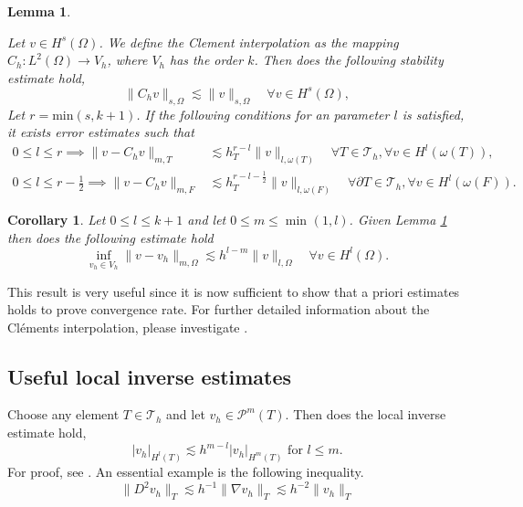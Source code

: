 \documentclass[11pt]{article}
\newtheorem{corollary}[theorem]{Corollary}
\newtheorem{lemma}[theorem]{Lemma}
\theoremstyle{remark}
\newcommand{\abs}[1]{\left\lvert #1 \right\rvert}
\renewcommand{\le}{\leqslant}
\numberwithin{equation}{section}
\begin{document}
\begin{lemma}
    \label{lemma:clements}

    Let $v \in H^{s}( \Omega ) $. We define the Clement interpolation as the mapping
$C_{h}: L^{2}( \Omega )   \to  V_{h}$, where $V_{h}$ has the order $k$. Then does the following stability estimate hold,
\[
 \| C_{h} v \|_{ s, \Omega     }^{  } \lesssim \| v \|_{ s, \Omega   }^{  } \quad \forall v \in H^{s}( \Omega ) ,
\]
Let $r = \mathrm{min} ( s, k+1) $. If the following conditions for an parameter $l$ is satisfied, it exists error estimates such that
\begin{equation}
    \begin{split}
      0\le l \le r  \implies \| v - C_{h} v \|_{ m,T   }^{  }  &  \lesssim h^{r-l}_{T} \| v \|_{l,\omega \left( T \right)  }^{  } \quad  \forall T \in \mathcal{T} _{h}, \forall v \in H^{l}( \omega \left( T \right)
      ), \\
      0\le l \le r-\frac{1}{2}  \implies \| v - C_{h} v \|_{ m,F }^{  } & \lesssim h^{r - l - \frac{1}{2}}_{T} \| v \|_{l,\omega \left( F \right)  }^{  } \quad  \forall \partial T \in \mathcal{T} _{h}, \forall v \in H^{l}( \omega \left( F
      \right)).
    \end{split}
\end{equation}

\end{lemma}


\begin{corollary}
    \label{cor:celement_apriori}
    Let $0 \le l \le k+1$ and let $0\le m \le \min_{} ( 1,l )$.
    Given Lemma \ref{lemma:clements}  then does the following estimate hold
    \[
    \inf_{v_{h} \in V_{h} } \| v - v_{h} \|_{  m,\Omega }^{  } \lesssim   h^{l-m}  \| v \|_{ l,\Omega  }^{  } \quad     \forall v \in H^{l}( \Omega ).
    \]
\end{corollary}
This result is very useful since it is now sufficient to show that a priori estimates holds to prove convergence rate. For further detailed information about the Cléments interpolation, please investigate \cite[Chapter 1.6]{ern04}.

\subsection{Useful local inverse estimates}%
\label{sub:some_general_inequalities}


    Choose any element $T \in \mathcal{T}_{h} $ and let $v_{h} \in \mathcal{P} ^{m}( T)   $. Then does the local inverse estimate hold,
\begin{equation}
\label{eq:inv1}
\abs{ v_{h} }_{H^{l}( T) }  \lesssim h^{m-l} \abs{ v_{h} }_{H^{m}( T  ) }
\text{ for } l \le m.
\end{equation}
 For proof, see \cite[Lemma 12.1]{ErnGuermond2021}. An essential example is the following inequality.
 \begin{equation}
     \label{eq:degrade}
\| D^2v_{h} \|_{T  }^{  } \lesssim h^{-1} \| \nabla v_{h}  \|_{ T  }^{  } \lesssim h^{-2} \| v_{h} \|_{T  }^{  }
 \end{equation}
\end{document}
